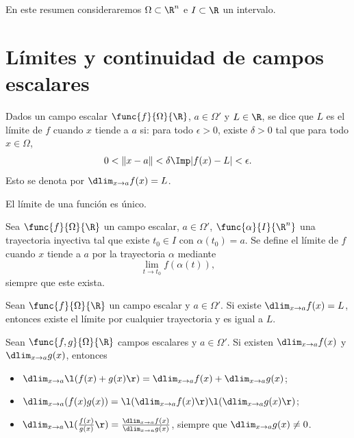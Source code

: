 \documentclass[a4,11pt]{aleph-notas}
\begin{document}
\encabezado

En este resumen consideraremos $\Omega\subset \R^n$ e $I\subset\R$ un intervalo.

\section{Límites y continuidad de campos escalares}

\begin{defi}[Límite]
    Dados un campo escalar $\func{f}{\Omega}{\R}$, $a\in \Omega'$ y $L\in\R$, se dice que $L$ es el límite de $f$ cuando $x$ tiende a $a$ si: para todo $\epsilon>0$, existe $\delta>0$ tal que para todo $x\in \Omega$,
    \[
        0<\|x-a\|<\delta \Imp |f(x)-L| < \epsilon.
    \]
    Esto se denota por $\dlim_{x\to a}f(x)=L$.
\end{defi}

\begin{prop}
    El límite de una función es único.
\end{prop}

\begin{defi}
    Sea $\func{f}{\Omega}{\R}$ un campo escalar, $a\in \Omega'$, $\func{\alpha}{I}{\R^n}$ una trayectoria inyectiva tal que existe $t_0\in I$ con $\alpha(t_0)=a$. Se define el límite de $f$ cuando $x$ tiende a $a$ por la trayectoria $\alpha$ mediante
    \[
        \lim_{t\to t_0} f(\alpha(t)),
    \]
    siempre que este exista.
\end{defi}

\begin{prop}
    Sean $\func{f}{\Omega}{\R}$ un campo escalar y $a\in \Omega'$. Si existe $\dlim_{x\to a}f(x)=L$, entonces existe el límite por cualquier trayectoria y es igual a $L$.
\end{prop}

\begin{prop}
    Sean $\func{f,g}{\Omega}{\R}$ campos escalares y $a\in \Omega'$. Si existen $\dlim_{x\to a}f(x)$ y $\dlim_{x\to a}g(x)$, entonces
    \begin{itemize}
        \item $\dlim_{x\to a}\l(f(x)+g(x)\r)=\dlim_{x\to a}f(x)+\dlim_{x\to a}g(x)$;
        \item $\dlim_{x\to a}(f(x)g(x))=\l(\dlim_{x\to a}f(x)\r)\l(\dlim_{x\to a}g(x)\r)$;
        \item $\dlim_{x\to a}\l(\frac{f(x)}{g(x)}\r)=\frac{\dlim_{x\to a}f(x)}{\dlim_{x\to a}g(x)}$, siempre que $\dlim_{x\to a}g(x)\neq 0$.
    \end{itemize}
\end{prop}
\end{document}
